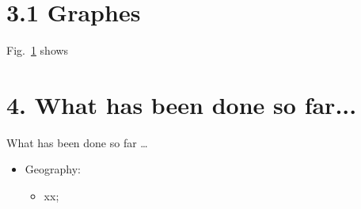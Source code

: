 \documentclass[xcolor=dvipsnames]{beamer}
\begin{document}
\section{3.1 Graphes}
\begin{frame}
Fig.~\ref{fig4} shows 
\begin{figure}[!ht] 
	\centering
	\caption{} 
	\label{fig4}
\end{figure}
\end{frame}


\section{4. What has been done so far...}
	\begin{frame}{\vskip 0.05cm\centerline{\Huge\textcolor{bscuro}{What has been done so far \ldots}}}
		\begin{itemize}
			\item Geography:
			\begin{itemize}
				\item xx;
			\end{itemize}
		\end{itemize}
\end{frame}
\end{document}

